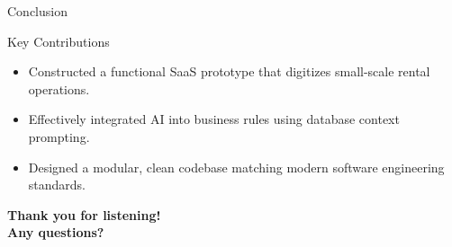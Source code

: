 \documentclass[10pt]{beamer}
\begin{document}
\begin{frame}{Conclusion}
    \begin{block}{Key Contributions}
        \begin{itemize}
            \item Constructed a functional SaaS prototype that digitizes small-scale rental operations.
            \item Effectively integrated AI into business rules using database context prompting.
            \item Designed a modular, clean codebase matching modern software engineering standards.
        \end{itemize}
    \end{block}
    
    \begin{center}
        \large\textbf{Thank you for listening! \\ Any questions?}
    \end{center}
\end{frame}
\end{document}
